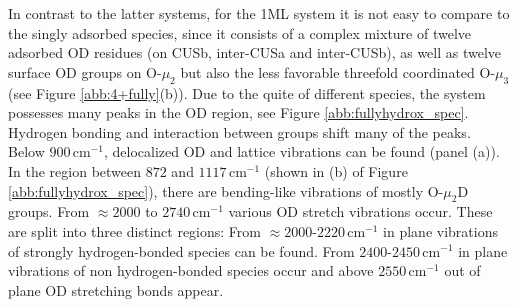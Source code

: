 \documentclass[11pt,DIV=13,BCOR=5mm,a4paper,headinclude]{scrbook}
\begin{document}
In contrast to the latter systems, for the 1ML system it is not easy to compare to the singly adsorbed species, since it consists of a complex mixture of twelve adsorbed OD residues (on CUSb, inter-CUSa and inter-CUSb), as well as twelve surface OD groups on O-$\mu_2$ but also the less favorable threefold coordinated O-$\mu_3$ (see Figure \ref{abb:4+fully}(b)).
Due to the quite of different species, the system possesses many peaks in the OD region, see Figure \ref{abb:fullyhydrox_spec}.
Hydrogen bonding and interaction between groups shift many of the peaks.
Below $900\,$cm$^{-1}$, delocalized OD and lattice vibrations can be found (panel (a)).
In the region between $872$ and $1117\,$cm$^{-1}$ (shown in (b) of Figure \ref{abb:fullyhydrox_spec}), there are bending-like vibrations of mostly O-$\mu_2$D groups.
From $\approx2000$ to $2740\,$cm$^{-1}$ various OD stretch vibrations occur.
These are split into three distinct regions: From $\approx 2000$-$2220\,$cm$^{-1}$ in plane vibrations of strongly hydrogen-bonded species can be found.
From $2400$-$2450\,$cm$^{-1}$ in plane vibrations of non hydrogen-bonded species occur and above $2550\,$cm$^{-1}$ out of plane OD stretching bonds appear.
\end{document}
